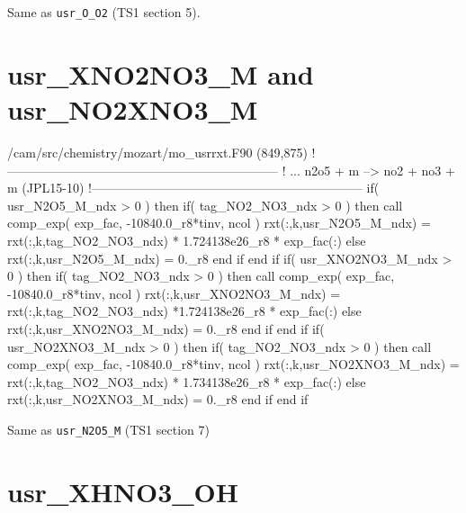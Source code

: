 \documentclass[titlepage]{article}
\begin{document}
Same as \verb>usr_O_O2> (TS1 section 5).


\section{usr\_XNO2NO3\_M and usr\_NO2XNO3\_M}

\begin{blockcode}[commandchars=\\\{\}]
\color{gray}/cam/src/chemistry/mozart/mo_usrrxt.F90 (849,875)
!-----------------------------------------------------------------
! ... n2o5 + m --> no2 + no3 + m (JPL15-10)
!-----------------------------------------------------------------
       if( usr_N2O5_M_ndx > 0 ) then
          if( tag_NO2_NO3_ndx > 0 ) then
             call comp_exp( exp_fac, -10840.0_r8*tinv, ncol )
             rxt(:,k,usr_N2O5_M_ndx) = rxt(:,k,tag_NO2_NO3_ndx) * 1.724138e26_r8 * exp_fac(:)
          else
             rxt(:,k,usr_N2O5_M_ndx) = 0._r8
          end if
       end if
       if( usr_XNO2NO3_M_ndx > 0 ) then
          if( tag_NO2_NO3_ndx > 0 ) then
             call comp_exp( exp_fac, -10840.0_r8*tinv, ncol )
             rxt(:,k,usr_XNO2NO3_M_ndx) = rxt(:,k,tag_NO2_NO3_ndx) *1.724138e26_r8 * exp_fac(:)
          else
             rxt(:,k,usr_XNO2NO3_M_ndx) = 0._r8
          end if
       end if
       if( usr_NO2XNO3_M_ndx > 0 ) then
          if( tag_NO2_NO3_ndx > 0 ) then
             call comp_exp( exp_fac, -10840.0_r8*tinv, ncol )
             rxt(:,k,usr_NO2XNO3_M_ndx) = rxt(:,k,tag_NO2_NO3_ndx) * 1.734138e26_r8 * exp_fac(:)
          else
             rxt(:,k,usr_NO2XNO3_M_ndx) = 0._r8
          end if
       end if
\end{blockcode}
 
Same as \verb>usr_N2O5_M> (TS1 section 7)
       

\section{usr\_XHNO3\_OH}
\end{document}

